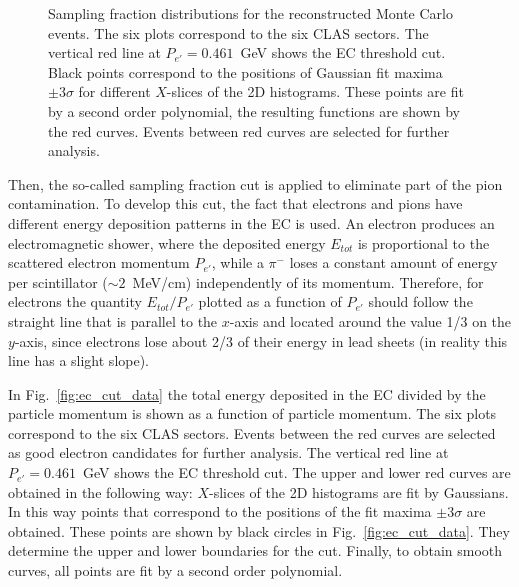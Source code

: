 \begin{figure}[htp]
\begin{center}
\caption{\small  Sampling fraction distributions for the reconstructed Monte Carlo events. The six plots correspond to the six CLAS sectors. The vertical red line at $P_{e'} = 0.461$~GeV shows the EC threshold cut. Black points correspond to the positions of Gaussian fit maxima $\pm 3\sigma$ for different $X$-slices of the 2D histograms. These points are fit by a second order polynomial, the resulting functions are shown by the red curves. Events between red curves are selected for further analysis.} \label{fig:ec_cut_sim}
\end{center}
\end{figure}



Then, the so-called sampling fraction cut is applied to eliminate part of the pion contamination. To develop this cut, the fact that electrons and pions have different energy deposition patterns in the EC is used. An electron produces an electromagnetic shower, where the deposited energy $E_{tot}$ is proportional to the scattered electron momentum $P_{e'}$, while a $\pi^{-}$ loses a constant amount of energy per scintillator ($\sim 2$~MeV/cm) independently of its momentum. Therefore, for electrons the quantity $E_{tot}/P_{e'}$ plotted as a function of $P_{e'}$ should follow the straight line that is parallel to the $x$-axis and located around the value 1/3 on the $y$-axis, since electrons lose about 2/3 of their energy in lead sheets (in reality this line has a slight slope).


In Fig.~\ref{fig:ec_cut_data} the total energy deposited in the EC divided by the particle momentum is shown as a function of particle momentum. The six plots correspond to the six CLAS sectors. Events between the red curves are selected as good electron candidates for further analysis. The vertical red line at $P_{e'} = 0.461$~GeV shows the EC threshold cut. The upper and lower red curves are obtained in the following way:  $X$-slices of the 2D histograms are fit by Gaussians. In this way points that correspond to the positions of the fit maxima $\pm 3\sigma$ are obtained. These points are shown by black circles in Fig.~\ref{fig:ec_cut_data}. They determine the upper and lower boundaries for the cut. Finally, to obtain smooth curves, all points are fit by a second order polynomial.  



